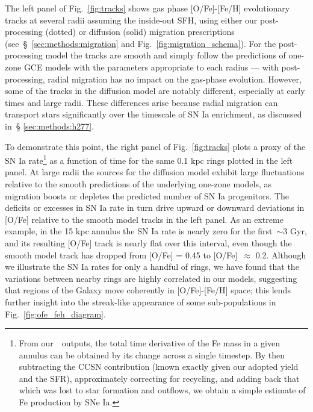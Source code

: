 \documentclass[draft2.tex]{subfiles}
\begin{document}
The left panel of Fig.~\ref{fig:tracks} shows gas phase [O/Fe]-[Fe/H] 
evolutionary tracks at several radii assuming the inside-out SFH, using either 
our post-processing (dotted) or diffusion (solid) migration prescriptions 
(see~\S~\ref{sec:methods:migration} and Fig.~\ref{fig:migration_schema}). 
For the post-processing model the tracks are smooth and simply follow the 
predictions of one-zone GCE models with the parameters appropriate to each 
radius --- with post-processing, radial migration has no impact on the gas-phase 
evolution. 
However, some of the tracks in the diffusion model are notably 
different, especially at early times and large radii. 
These differences arise because radial migration can transport stars 
significantly over the timescale of SN Ia enrichment, as discussed in~\S 
\ref{sec:methods:h277}.
\par 
To demonstrate this point, the right panel of Fig.~\ref{fig:tracks} plots a 
proxy of the SN Ia rate\footnote{
	From our~\vice~outputs, the total time derivative of the Fe mass in a given 
	annulus can be obtained by its change across a single timestep. By then 
	subtracting the CCSN contribution (known exactly given our adopted yield 
	and the SFR), approximately correcting for recycling, and adding back that 
	which was lost to star formation and outflows, we obtain a simple estimate 
	of Fe production by SNe Ia. 
} as a function of time for the same 0.1 kpc rings plotted in the left panel. 
At large radii the sources for the diffusion model exhibit large fluctuations 
relative to the smooth predictions of the underlying one-zone models, as 
migration boosts or depletes the predicted number of SN Ia progenitors. 
The deficits or excesses in SN Ia rate in turn drive upward or downward 
deviations in [O/Fe] relative to the smooth model tracks in the left panel. 
As an extreme example, in the 15 kpc annulus the SN Ia rate is nearly zero for 
the first~$\sim$3 Gyr, and its resulting [O/Fe] track is nearly flat over this 
interval, even though the smooth model track has dropped from [O/Fe] = 0.45 to 
[O/Fe]~$\approx$ 0.2. 
Although we illustrate the SN Ia rates for only a handful of rings, we have 
found that the variations between nearby rings are highly correlated in our 
models, suggesting that regions of the Galaxy move coherently in 
[O/Fe]-[Fe/H] space; this lends further insight into the streak-like appearance 
of some sub-populations in Fig.~\ref{fig:ofe_feh_diagram}. 
\end{document}
